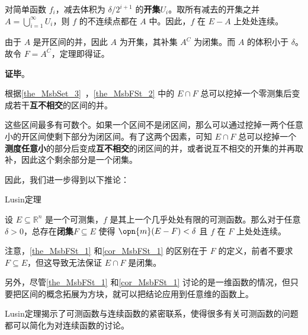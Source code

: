 对简单函数 $f_i$，减去体积为 $\delta/2^{i+1}$ 的\textbf{开集}$U_i$。取所有减去的开集之并 $A=\bigcup_{i=1}^\infty U_i$，则 $f$ 的不连续点都在 $A$ 中。因此，$f$ 在 $E-A$ 上处处连续。

由于 $A$ 是开区间的并，因此 $A$ 为开集，其补集 $A^C$ 为闭集。而 $A$ 的体积小于 $\delta$。故令 $F=A^C$，定理即得证。

\textbf{证毕}。

根据\autoref{the_MsbSet_3}~，\autoref{the_MsbFSt_2} 中的 $E\cap F$ 总可以挖掉一个零测集后变成若干\textbf{互不相交}的区间的并。

这些区间最多有可数个。如果一个区间不是闭区间，那么可以通过挖掉一两个任意小的开区间使剩下部分为闭区间。有了这两个因素，可知 $E\cap F$ 总可以挖掉一个\textbf{测度任意小}的部分后变成\textbf{互不相交}的闭区间的并，或者说互不相交的开集的并再取补，因此这个剩余部分是一个闭集。

因此，我们进一步得到以下推论：

\begin{corollary}{Lusin定理}\label{cor_MsbFSt_1}

设 $E\subseteq\mathbb{R}^n$ 是一个可测集，$f$ 是其上一个几乎处处有限的可测函数。那么对于任意 $\delta>0$，总存在\textbf{闭集}$F\subseteq E$ 使得 $\opn{m}(E-F)<\delta$ 且 $f$ 在 $F$ 上处处连续。

\end{corollary}

注意，\autoref{the_MsbFSt_1} 和\autoref{cor_MsbFSt_1} 的区别在于 $F$ 的定义，前者不要求 $F\subseteq E$，但这导致无法保证 $E\cap F$ 是闭集。

另外，尽管\autoref{the_MsbFSt_1} 和\autoref{cor_MsbFSt_1} 讨论的是一维函数的情况，但只要把区间的概念拓展为方块，就可以把结论应用到任意维的函数上。

Lusin定理揭示了可测函数与连续函数的紧密联系，使得很多有关可测函数的问题都可以简化为对连续函数的讨论。















